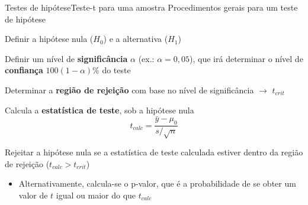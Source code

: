 \documentclass[10pt]{beamer}\usepackage[]{graphicx}\usepackage[]{color}
\makeatletter
\newcommand{\hlstr}[1]{\textcolor[rgb]{0.192,0.494,0.8}{#1}}%
\newcommand{\hlopt}[1]{\textcolor[rgb]{0,0,0}{#1}}%
\newcommand{\hlstd}[1]{\textcolor[rgb]{0.345,0.345,0.345}{#1}}%
\newcommand{\hlkwc}[1]{\textcolor[rgb]{0.333,0.667,0.333}{#1}}%
\newcommand{\hlkwd}[1]{\textcolor[rgb]{0.737,0.353,0.396}{\textbf{#1}}}%
\newenvironment{kframe}{%
 \def\at@end@of@kframe{}%
 \ifinner\ifhmode%
  \def\at@end@of@kframe{\end{minipage}}%
  \begin{minipage}{\columnwidth}%
 \fi\fi%
 \def\FrameCommand##1{\hskip\@totalleftmargin \hskip-\fboxsep
 \colorbox{shadecolor}{##1}\hskip-\fboxsep
     \hskip-\linewidth \hskip-\@totalleftmargin \hskip\columnwidth}%
 \MakeFramed {\advance\hsize-\width
   \@totalleftmargin\z@ \linewidth\hsize
   \@setminipage}}%
 {\par\unskip\endMakeFramed%
 \at@end@of@kframe}
\newenvironment{knitrout}{}{} %
\theoremstyle{definition}
\makeatother
\begin{document}

\begin{frame}[fragile=singleslide]{Testes de hipótese}{Teste-t
    para uma amostra}
Procedimentos gerais para um teste de hipótese
\begin{compactenum}[(1)]
\item Definir a hipótese nula ($H_0$) e a alternativa ($H_1$)
\item Definir um nível de \textbf{significância} $\alpha$ (ex.: $\alpha
  = 0,05$), que irá determinar o nível de \textbf{confiança}
  $100(1-\alpha)\%$ do teste
\item Determinar a \textbf{região de rejeição} com base no nível de
  significância $\rightarrow$ $t_{crit}$
\item Calcula a \textbf{estatística de teste}, sob a hipótese nula
  \begin{equation*}
    t_{calc} = \frac{\bar{y} - \mu_0}{s/\sqrt{n}}
  \end{equation*}
\item Rejeitar a hipótese nula se a estatística de teste calculada
  estiver dentro da região de rejeição ($t_{calc} > t_{crit}$)
  \begin{itemize}
  \item Alternativamente, calcula-se o p-valor, que é a probabilidade de
    se obter um valor de $t$ igual ou maior do que $t_{calc}$
  \end{itemize}
\end{compactenum}
\end{frame}
\end{document}
